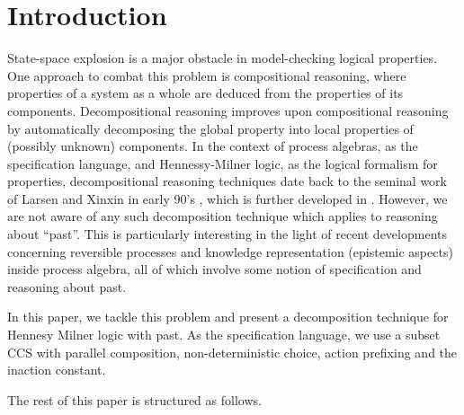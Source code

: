 \section{Introduction}
State-space explosion is a major obstacle in model-checking logical properties.
One approach to combat this problem is compositional reasoning,
where properties of a system as a whole are deduced from the properties of its components.
Decompositional reasoning \cite{Giannakopoulou05,Xie05} improves upon compositional reasoning by
automatically decomposing the global property into local properties of (possibly unknown) components.
In the context of process algebras, as the specification language, and Hennessy-Milner logic, as the logical formalism for properties,
decompositional reasoning techniques date back to the seminal work of Larsen and Xinxin in early 90's \cite{Larsen91},
which is further developed in \cite{Simpson04,Fokkink06}.
However, we are not aware of any such decomposition technique which applies to reasoning about ``past''.
This is particularly interesting in the light of recent developments concerning reversible processes and
knowledge representation (epistemic aspects) inside process algebra,
all of which involve some notion of specification and reasoning about past.


In this paper, we tackle this problem and present a decomposition technique for Hennesy Milner logic with past.
As the specification language, we use a subset CCS with parallel composition, non-deterministic choice, action prefixing
and the inaction constant.

The rest of this paper is structured as follows.

